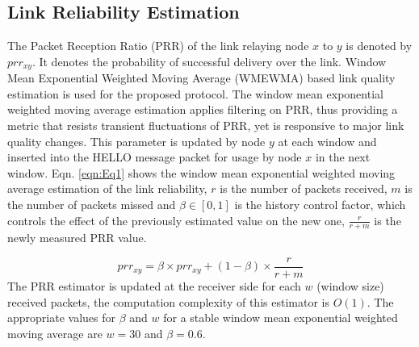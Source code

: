 \documentclass[fleqn,twoside]{article}
\begin{document}
\subsection{Link Reliability Estimation}
The Packet Reception Ratio (PRR) of the link relaying node $x$ to $y$ is denoted by $prr_{xy}$. It denotes the probability of successful 
delivery over the link. Window Mean Exponential Weighted Moving Average (WMEWMA) based link quality estimation is used for the proposed protocol. The window mean exponential weighted moving average estimation applies filtering on PRR, thus providing a metric that resists transient fluctuations of PRR, yet is responsive to major link quality changes.
This parameter is updated by node $y$ at each window and inserted into the HELLO message packet for usage by node $x$ in the next window. 
Eqn. \ref{eqn:Eq1} shows the window mean exponential weighted moving average estimation of the link reliability, $r$ is the number of packets received, $m$ is the number of packets missed and $\beta \in [0,1]$ is the history control factor, which controls the effect of the previously estimated value on the new one, $\frac{r}{r+m}$ is the newly measured PRR value.

\begin{equation}
prr_{xy} = \beta \times prr_{xy} + (1-\beta) \times \frac{r}{r+m} 
\label{eqn:Eq1}
\end{equation}
The PRR estimator is updated at the receiver side for each $w$ (window size) received packets, the computation complexity of
this estimator is $O(1)$. The appropriate values for $\beta$ and $w$ for a stable window mean exponential weighted moving average are $w=30$ and $\beta=0.6$\cite{EELRE1}.
\end{document}
